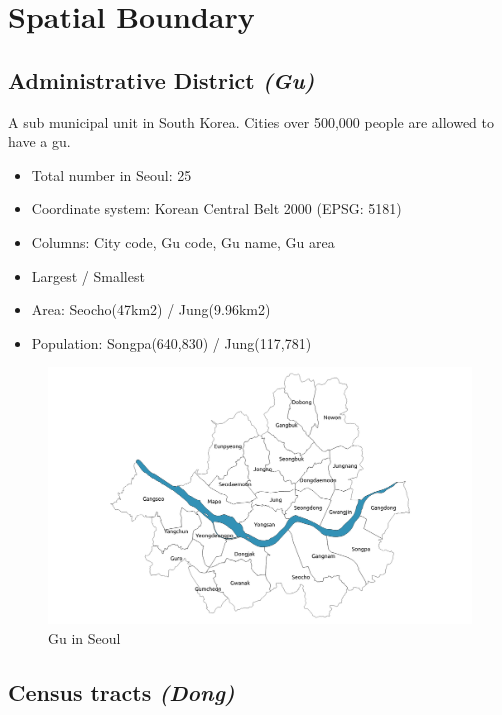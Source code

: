 \documentclass[]{book}
\providecommand{\tightlist}{%
  \setlength{\itemsep}{0pt}\setlength{\parskip}{0pt}}
\begin{document}
\chapter{Spatial Boundary}\label{spatial-boundary}

\section{\texorpdfstring{Administrative District
\emph{(Gu)}}{Administrative District (Gu)}}\label{administrative-district-gu}

A sub municipal unit in South Korea. Cities over 500,000 people are
allowed to have a gu.

\begin{itemize}
\tightlist
\item
  Total number in Seoul: 25
\item
  Coordinate system: Korean Central Belt 2000 (EPSG: 5181)
\item
  Columns: City code, Gu code, Gu name, Gu area
\item
  Largest / Smallest
\item
  Area: Seocho(47km2) / Jung(9.96km2)
\item
  Population: Songpa(640,830) / Jung(117,781)
\end{itemize}

\begin{figure}

{\centering \includegraphics[width=21.57in]{images/03_gu} 

}

\caption{\label{fig:figs}Gu in Seoul}\label{fig:unnamed-chunk-3}
\end{figure}

\section{\texorpdfstring{Census tracts
\emph{(Dong)}}{Census tracts (Dong)}}\label{census-tracts-dong}
\end{document}

